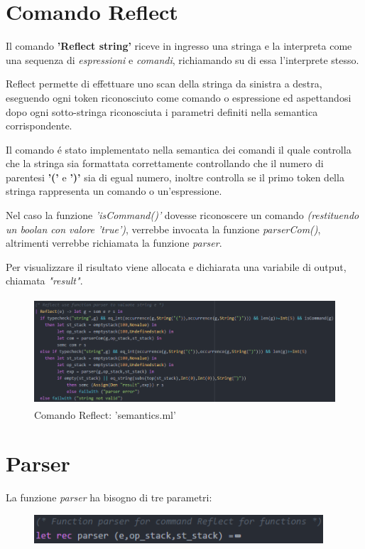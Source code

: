 \documentclass[a4paper,titlepage]{book}
\begin{document}
\section{Comando Reflect}
Il comando \textbf{'Reflect string'} riceve in ingresso una stringa e la interpreta come una sequenza di \textit{espressioni} e \textit{comandi}, richiamando su di essa l'interprete stesso.

Reflect permette di effettuare uno scan della stringa da sinistra a destra, eseguendo ogni token riconosciuto come comando o espressione ed aspettandosi dopo ogni sotto-stringa riconosciuta i parametri definiti nella semantica corrispondente.

Il comando \'e stato implementato nella semantica dei comandi il quale controlla che la stringa sia formattata correttamente controllando che il numero di parentesi \textbf{'('} e \textbf{')'} sia di egual numero, inoltre controlla se il primo token della stringa rappresenta un comando o un'espressione.

Nel caso la funzione \textit{'isCommand()'} dovesse riconoscere un comando \textit{(restituendo un boolan con valore 'true')}, verrebbe invocata la funzione \textit{parserCom()}, altrimenti verrebbe richiamata la funzione \textit{parser}.

Per visualizzare il risultato viene allocata e dichiarata una variabile di output, chiamata \textit{"result"}.

\begin{figure}[H]
\includegraphics[height=150px]{img/reflect.png}
\caption{Comando Reflect: 'semantics.ml' \label{fig:reflect}}
\end{figure}

\section{Parser}
La funzione \textit{parser} ha bisogno di tre parametri:

\begin{figure}[H]
\includegraphics[height=40px]{img/parser.png}
\end{figure}
\end{document}
